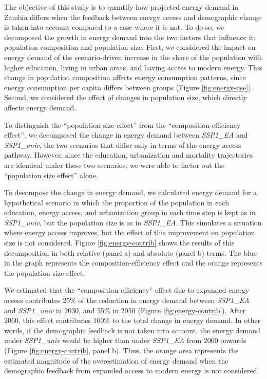 \documentclass[
]{article}
\begin{document}
The objective of this study is to quantify how projected energy demand in Zambia differs when the feedback between energy access and demographic change is taken into account compared to a case where it is not. To do so, we decomposed the growth in energy demand into the two factors that influence it: population composition and population size. First, we considered the impact on energy demand of the scenario-driven increase in the share of the population with higher education, living in urban areas, and having access to modern energy. This change in population composition affects energy consumption patterns, since energy consumption per capita differs between groups (Figure \ref{fig:energy-use}). Second, we considered the effect of changes in population size, which directly affects energy demand.

To distinguish the ``population size effect'' from the ``composition-efficiency effect'', we decomposed the change in energy demand between \emph{SSP1\_EA} and \emph{SSP1\_univ}, the two scenarios that differ only in terms of the energy access pathway. However, since the education, urbanization and mortality trajectories are identical under these two scenarios, we were able to factor out the ``population size effect'' alone.

To decompose the change in energy demand, we calculated energy demand for a hypothetical scenario in which the proportion of the population in each education, energy access, and urbanization group in each time step is kept as in \emph{SSP1\_univ}, but the population size is as in \emph{SSP1\_EA}. This simulates a situation where energy access improves, but the effect of this improvement on population size is not considered. Figure \ref{fig:energy-contrib} shows the results of this decomposition in both relative (panel a) and absolute (panel b) terms. The blue in the graph represents the composition-efficiency effect and the orange represents the population size effect.

We estimated that the ``composition efficiency'' effect due to expanded energy access contributes 25\% of the reduction in energy demand between \emph{SSP1\_EA} and \emph{SSP1\_univ} in 2030, and 55\% in 2050 (Figure \ref{fig:energy-contrib}). After 2060, this effect contributes 100\% to the total change in energy demand. In other words, if the demographic feedback is not taken into account, the energy demand under \emph{SSP1\_univ} would be higher than under \emph{SSP1\_EA} from 2060 onwards (Figure \ref{fig:energy-contrib}, panel b). Thus, the orange area represents the estimated magnitude of the overestimation of energy demand when the demographic feedback from expanded access to modern energy is not considered.
\end{document}
